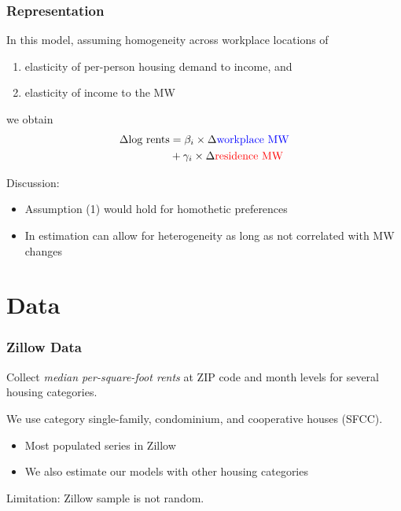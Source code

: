 \documentclass[aspectratio=169, t]{beamer}
\begin{document}
\begin{frame}
    \frametitle{Representation}

    In this model, assuming homogeneity across workplace locations of
    \begin{enumerate}
        \item elasticity of per-person housing demand to income, and
        \item elasticity of income to the MW
    \end{enumerate}
    we obtain
    \[
    \begin{split}
        \Delta \text{log rents} & = \beta_i  \times \Delta {\color{blue}  \text{workplace MW}} \\
                                & + \gamma_i \times \Delta {\color{red} \text{residence MW}} \\
    \end{split}
    \]

    \vspace{3mm}
    \pause
    Discussion:
    \begin{itemize}
        \item Assumption (1) would hold for homothetic preferences
        \item In estimation can allow for heterogeneity as long as not correlated with MW changes
    \end{itemize}

\end{frame}


\section{Data}

\begin{frame}[label = zillow_data]
    \frametitle{Zillow Data}
    
    Collect \textit{median per-square-foot rents} at ZIP code and month levels for several housing categories.
        
    \pause
    \vspace{2mm}
    We use category single-family, condominium, and cooperative houses (SFCC).
    \begin{itemize}
        \item Most populated series in Zillow
        \item We also estimate our models with other housing categories
    \end{itemize}
        
    \vspace{2mm}
    Limitation: Zillow sample is not random.

    \hyperlink{zillow_pop_density}{}
\end{frame}
\end{document}
